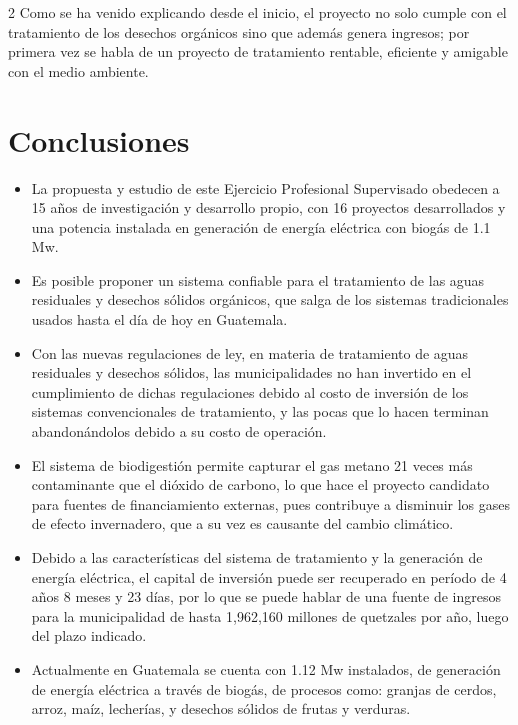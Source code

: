 \documentclass[11pt,spanish,Letterpaper,openany]{book}
\begin{document}
\begin {multicols}{2}
Como se ha venido explicando desde el inicio, el proyecto no solo cumple con el tratamiento de los desechos orgánicos sino que además genera ingresos; por primera vez se habla de un proyecto de tratamiento rentable, eficiente y amigable con el medio ambiente.

\hypertarget{conclusiones-1}{%
\section{Conclusiones}\label{conclusiones-1}}

\begin{itemize}
\item
  La propuesta y estudio de este Ejercicio Profesional Supervisado obedecen a 15 años de investigación y desarrollo propio, con 16 proyectos desarrollados y una potencia instalada en generación de energía eléctrica con biogás de 1.1 Mw.
\item
  Es posible proponer un sistema confiable para el tratamiento de las aguas residuales y desechos sólidos orgánicos, que salga de los sistemas tradicionales usados hasta el día de hoy en Guatemala.
\item
  Con las nuevas regulaciones de ley, en materia de tratamiento de aguas residuales y desechos sólidos, las municipalidades no han invertido en el cumplimiento de dichas regulaciones debido al costo de inversión de los sistemas convencionales de tratamiento, y las pocas que lo hacen terminan abandonándolos debido a su costo de operación.
\item
  El sistema de biodigestión permite capturar el gas metano 21 veces más contaminante que el dióxido de carbono, lo que hace el proyecto candidato para fuentes de financiamiento externas, pues contribuye a disminuir los gases de efecto invernadero, que a su vez es causante del cambio climático.
\item
  Debido a las características del sistema de tratamiento y la generación de energía eléctrica, el capital de inversión puede ser recuperado en período de 4 años 8 meses y 23 días, por lo que se puede hablar de una fuente de ingresos para la municipalidad de hasta 1,962,160 millones de quetzales por año, luego del plazo indicado.
\item
  Actualmente en Guatemala se cuenta con 1.12 Mw instalados, de generación de energía eléctrica a través de biogás, de procesos como: granjas de cerdos, arroz, maíz, lecherías, y desechos sólidos de frutas y verduras.
\end{itemize}


\end{multicols}
\end{document}
